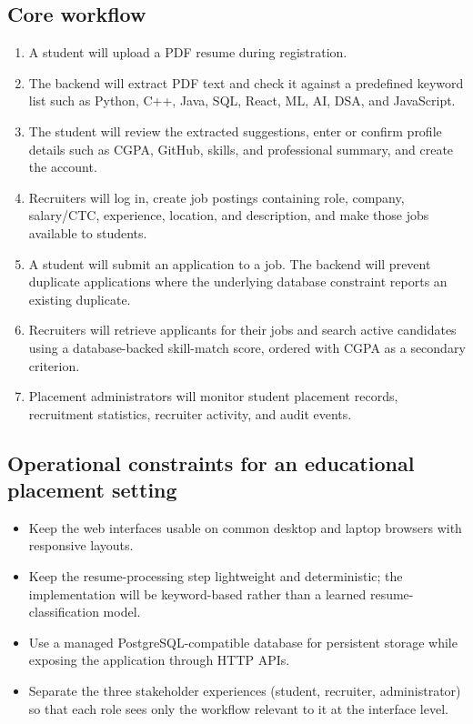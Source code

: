 \documentclass[11pt,a4paper]{article}
\begin{document}
\subsection{Core workflow}
\begin{enumerate}[leftmargin=0.7cm]
    \item A student will upload a PDF resume during registration.
    \item The backend will extract PDF text and check it against a predefined keyword list such as Python, C++, Java, SQL, React, ML, AI, DSA, and JavaScript.
    \item The student will review the extracted suggestions, enter or confirm profile details such as CGPA, GitHub, skills, and professional summary, and create the account.
    \item Recruiters will log in, create job postings containing role, company, salary/CTC, experience, location, and description, and make those jobs available to students.
    \item A student will submit an application to a job. The backend will prevent duplicate applications where the underlying database constraint reports an existing duplicate.
    \item Recruiters will retrieve applicants for their jobs and search active candidates using a database-backed skill-match score, ordered with CGPA as a secondary criterion.
    \item Placement administrators will monitor student placement records, recruitment statistics, recruiter activity, and audit events.
\end{enumerate}

\subsection{Operational constraints for an educational placement setting}
\begin{itemize}[leftmargin=0.7cm]
    \item Keep the web interfaces usable on common desktop and laptop browsers with responsive layouts.
    \item Keep the resume-processing step lightweight and deterministic; the implementation will be keyword-based rather than a learned resume-classification model.
    \item Use a managed PostgreSQL-compatible database for persistent storage while exposing the application through HTTP APIs.
    \item Separate the three stakeholder experiences (student, recruiter, administrator) so that each role sees only the workflow relevant to it at the interface level.
\end{itemize}
\end{document}
